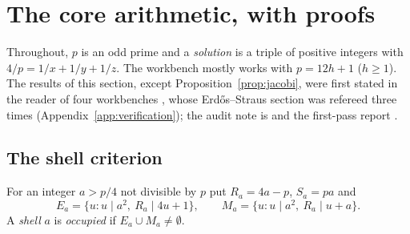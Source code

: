 \section{The core arithmetic, with proofs}\label{sec:core}

Throughout, $p$ is an odd prime and a \emph{solution} is a triple of positive integers with $4/p=1/x+1/y+1/z$. The workbench mostly works with $p=12h+1$ ($h\ge1$). The results of this section, except Proposition~\ref{prop:jacobi}, were first stated in the reader of four workbenches \cite{WorkbenchReader}, whose Erdős--Straus section was refereed three times (Appendix~\ref{app:verification}); the audit note is  and the first-pass report .

\subsection{The shell criterion}

For an integer $a>p/4$ not divisible by $p$ put $R_a=4a-p$, $S_a=pa$ and
\[
E_a=\{u: u\mid a^2,\ R_a\mid 4u+1\},\qquad M_a=\{u: u\mid a^2,\ R_a\mid u+a\}.
\]
A \emph{shell} $a$ is \emph{occupied} if $E_a\cup M_a\neq\emptyset$.

